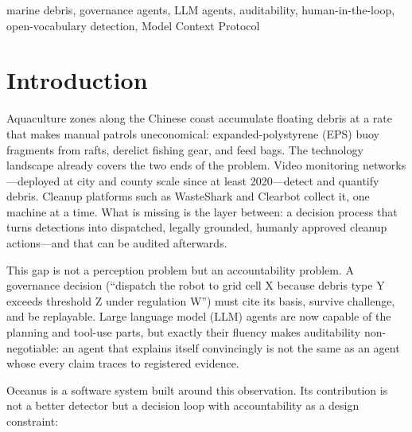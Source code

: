 \documentclass[conference]{IEEEtran}
\begin{document}
\begin{IEEEkeywords}
marine debris, governance agents, LLM agents, auditability,
human-in-the-loop, open-vocabulary detection, Model Context Protocol
\end{IEEEkeywords}

\section{Introduction}
Aquaculture zones along the Chinese coast accumulate floating debris at a
rate that makes manual patrols uneconomical: expanded-polystyrene (EPS) buoy
fragments from rafts, derelict fishing gear, and feed bags. The technology
landscape already covers the two ends of the problem. Video monitoring
networks---deployed at city and county scale since at least
2020---detect and quantify debris. Cleanup platforms such as WasteShark and
Clearbot collect it, one machine at a time. What is missing is the layer
between: a decision process that turns detections into dispatched,
legally grounded, humanly approved cleanup actions---and that can be
audited afterwards.

This gap is not a perception problem but an accountability problem. A
governance decision (``dispatch the robot to grid cell X because debris type
Y exceeds threshold Z under regulation W'') must cite its basis, survive
challenge, and be replayable. Large language model (LLM) agents are now
capable of the planning and tool-use parts, but exactly their fluency makes
auditability non-negotiable: an agent that explains itself convincingly is
not the same as an agent whose every claim traces to registered evidence.

Oceanus is a software system built around this observation. Its contribution
is not a better detector but a decision loop with accountability as a design
constraint:
\end{document}
